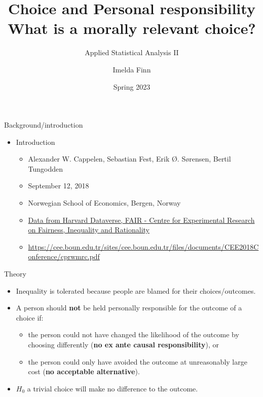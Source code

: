 \documentclass{beamer}
\title{Choice and Personal responsibility\\What is a morally relevant choice?}
\author{Imelda Finn}
\subtitle{Applied Statistical Analysis II}
\date{Spring 2023}
\begin{document}
	\frame{\titlepage}

	\begin{frame}{Background/introduction}

		\begin{block}

			\begin{itemize}

				\item Introduction \vspace{.25cm}
				\begin{itemize}
					\item Alexander W. Cappelen, Sebastian Fest, Erik Ø. Sørensen, Bertil Tungodden
					\item September 12, 2018
					\item Norwegian School of Economics, Bergen, Norway
					\item \href{https://dataverse.harvard.edu/dataset.xhtml?persistentId=doi:10.7910/DVN/A6KFNO}{Data from Harvard Dataverse, FAIR - Centre for Experimental Research on Fairness, Inequality and Rationality}
					\item 					\url{https://cee.boun.edu.tr/sites/cee.boun.edu.tr/files/documents/CEE2018Conference/cprwmrc.pdf} %
				\end{itemize}
			\end{itemize}
		\end{block}
	\end{frame}

	\begin{frame}{Theory}

	\begin{block}

		\begin{itemize}
			\item Inequality is tolerated because people are blamed for their choices/outcomes.
			\item A person should \textbf{not} be held personally responsible for the outcome of a choice if:
			\begin{itemize}
				\item the person could not have changed the likelihood of the outcome by choosing differently (\textbf{no ex ante causal responsibility}), or
				\item  the person could only have avoided the outcome at unreasonably large cost (\textbf{no acceptable alternative}).
			\end{itemize}
			\item 	$H_0$ a trivial choice will make no difference to the outcome.
		\end{itemize}
	\end{block}
\end{frame}
\end{document}
